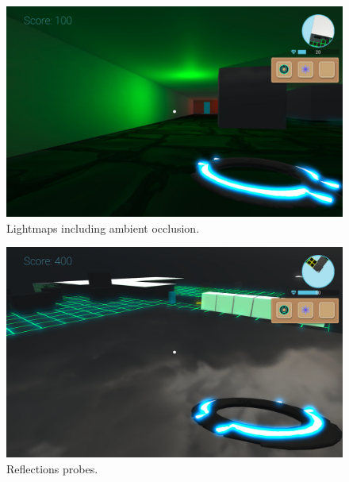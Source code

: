 \documentclass[a4paper]{article}
\begin{document}
    \begin{figure}[H]
      \begin{center}
          \includegraphics[width=\linewidth]{LightMaps.jpg}

      \end{center}
      \caption{Lightmaps including ambient occlusion. }
  \end{figure}
    \begin{figure}[H]
      \begin{center}
          \includegraphics[width=\linewidth]{Reflection.jpg}

      \end{center}
      \caption{Reflections probes. }
  \end{figure}





\newpage


\end{document}

